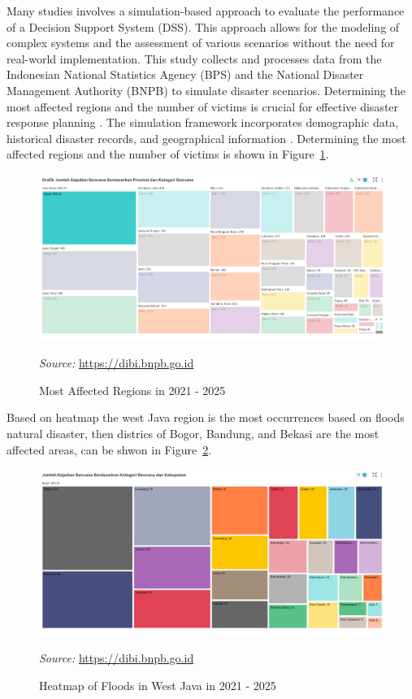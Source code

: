 \documentclass[journal,final,a4paper,twoside,11pt]{IEEEtran}
\begin{document}
Many studies involves a simulation-based approach to evaluate the performance of a Decision Support System (DSS)\cite{he2020dynamic}. This approach allows for the modeling of complex systems and the assessment of various scenarios without the need for real-world implementation\cite{latchmore2023integrating}. This study collects and processes data from the Indonesian National Statistics Agency (BPS) and the National Disaster Management Authority (BNPB) to simulate disaster scenarios. Determining the most affected regions and the number of victims is crucial for effective disaster response planning \cite{endo2020estimating}. The simulation framework incorporates demographic data, historical disaster records, and geographical information \cite{santos2020workforce}. Determining the most affected regions and the number of victims is shown in Figure~\ref{fig:simulationframework}. 
\begin{figure}[htbp]
    \centerline{\includegraphics[width=0.8\linewidth]{fig4.png}
    }
    \caption{Most Affected Regions in 2021 - 2025}
    \label{fig:simulationframework}
    \footnotesize{\textit{Source:} \url{https://dibi.bnpb.go.id}}
\end{figure}

Based on heatmap the west Java region is the most occurrences based on floods natural disaster, then districs of Bogor, Bandung, and Bekasi are the most affected areas, can be shwon in Figure~\ref{fig:heatmap2}. 
\begin{figure}[htbp]
    \centerline{\includegraphics[width=0.8\linewidth]{fig5.png}}
    \caption{Heatmap of Floods in West Java in 2021 - 2025}
    \label{fig:heatmap2}
    \footnotesize{\textit{Source:} \url{https://dibi.bnpb.go.id}}
\end{figure} 
\end{document}
